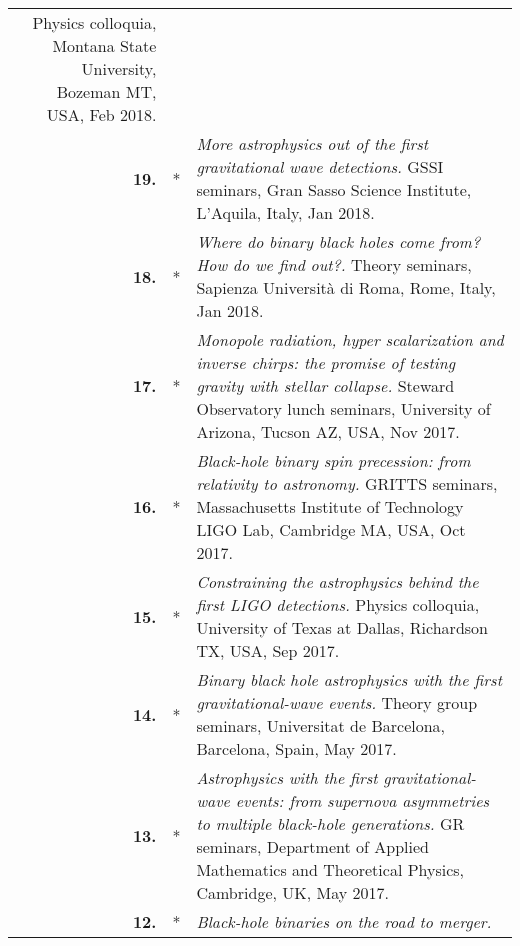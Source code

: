 {\begin{longtable}{rp{0.3cm}p{15.8cm}}
Physics colloquia, Montana State University, Bozeman MT, USA, Feb 2018.
\vspace{0.05cm}\\
%
\textbf{19.} & * & \textit{More astrophysics out of the first gravitational wave detections.}
\newline{}
GSSI seminars, Gran Sasso Science Institute, L'Aquila, Italy, Jan 2018.
\vspace{0.05cm}\\
%
\textbf{18.} & * & \textit{Where do binary black holes come from? How do we find out?.}
\newline{}
Theory seminars, Sapienza Universit\`a di Roma, Rome, Italy, Jan 2018.
\vspace{0.05cm}\\
%
\textbf{17.} & * & \textit{Monopole radiation, hyper scalarization and inverse chirps: the promise of testing gravity with stellar collapse.}
\newline{}
Steward Observatory lunch seminars, University of Arizona, Tucson AZ, USA, Nov 2017.
\vspace{0.05cm}\\
%
\textbf{16.} & * & \textit{Black-hole binary spin precession: from relativity to astronomy.}
\newline{}
GRITTS seminars, Massachusetts Institute of Technology LIGO Lab, Cambridge MA, USA, Oct 2017.
\vspace{0.05cm}\\
%
\textbf{15.} & * & \textit{Constraining the astrophysics behind the first LIGO detections.}
\newline{}
Physics colloquia, University of Texas at Dallas, Richardson TX, USA, Sep 2017.
\vspace{0.05cm}\\
%
\textbf{14.} & * & \textit{Binary black hole astrophysics with the first gravitational-wave events.}
\newline{}
Theory group seminars, Universitat de Barcelona, Barcelona, Spain, May 2017.
\vspace{0.05cm}\\
%
\textbf{13.} & * & \textit{Astrophysics with the first gravitational-wave events: from supernova asymmetries to multiple black-hole generations.}
\newline{}
GR seminars, Department of Applied Mathematics and Theoretical Physics, Cambridge, UK, May 2017.
\vspace{0.05cm}\\
%
\textbf{12.} & * & \textit{Black-hole binaries on the road to merger.}

\end{longtable}}
